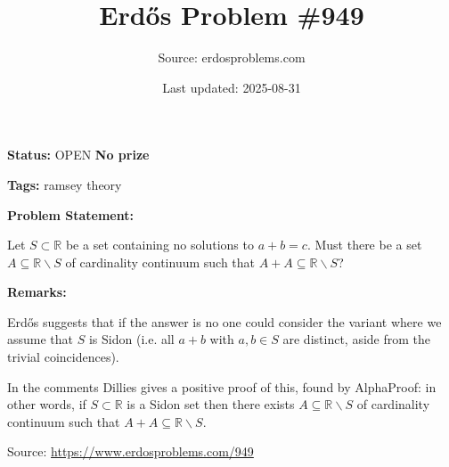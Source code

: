 \documentclass{article}
\title{Erd\H{o}s Problem \#949}
\date{Last updated: 2025-08-31}
\author{Source: erdosproblems.com}
\begin{document}
\maketitle

\noindent\textbf{Status:} OPEN \quad \textbf{No prize}

\noindent\textbf{Tags:} ramsey theory

\medskip
\noindent\textbf{Problem Statement:}

Let $S\subset \mathbb{R}$ be a set containing no solutions to $a+b=c$. Must there be a set $A\subseteq \mathbb{R}\backslash S$ of cardinality continuum such that $A+A\subseteq \mathbb{R}\backslash S$?

\bigskip
\noindent\textbf{Remarks:}

Erd\H{o}s suggests that if the answer is no one could consider the variant where we assume that $S$ is Sidon (i.e. all $a+b$ with $a,b\in S$ are distinct, aside from the trivial coincidences).

In the comments Dillies gives a positive proof of this, found by AlphaProof: in other words, if $S\subset \mathbb{R}$ is a Sidon set then there exists $A\subseteq \mathbb{R}\backslash S$ of cardinality continuum such that $A+A\subseteq \mathbb{R}\backslash S$.

\bigskip
\noindent\small{Source: \url{https://www.erdosproblems.com/949}}
\end{document}
